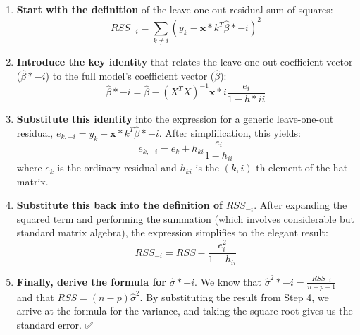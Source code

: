 \documentclass[
]{article}
\begin{document}
\begin{enumerate}
\def\labelenumi{\arabic{enumi}.}
\item
  \textbf{Start with the definition} of the leave-one-out residual sum
  of squares: \[
  RSS_{-i} = \sum_{k \neq i} (y_k - \mathbf{x}*k^T\hat{\beta}*{-i})^2
  \]
\item
  \textbf{Introduce the key identity} that relates the leave-one-out
  coefficient vector (\(\hat{\beta}*{-i}\)) to the full model's
  coefficient vector (\(\hat{\beta}\)): \[
  \hat{\beta}*{-i} = \hat{\beta} - (X^TX)^{-1}\mathbf{x}*i \frac{e_i}{1 - h*{ii}}
  \]
\item
  \textbf{Substitute this identity} into the expression for a generic
  leave-one-out residual,
  \(e_{k,-i} = y_k - \mathbf{x}*k^T\hat{\beta}*{-i}\). After
  simplification, this yields: \[
  e_{k,-i} = e_k + h_{ki} \frac{e_i}{1 - h_{ii}}
  \] where \(e_k\) is the ordinary residual and \(h_{ki}\) is the
  \((k,i)\)-th element of the hat matrix.
\item
  \textbf{Substitute this back into the definition of} \(RSS_{-i}\).
  After expanding the squared term and performing the summation (which
  involves considerable but standard matrix algebra), the expression
  simplifies to the elegant result: \[
  RSS_{-i} = RSS - \frac{e_i^2}{1 - h_{ii}}
  \]
\item
  \textbf{Finally, derive the formula for} \(\hat{\sigma}*{-i}\). We
  know that \(\hat{\sigma}^2*{-i} = \frac{RSS_{-i}}{n-p-1}\) and that
  \(RSS = (n-p)\hat{\sigma}^2\). By substituting the result from Step 4,
  we arrive at the formula for the variance, and taking the square root
  gives us the standard error. ✅
\end{enumerate}
\end{document}

